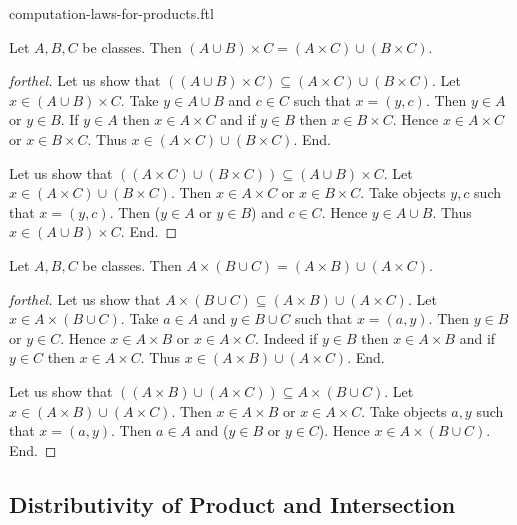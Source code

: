 \documentclass{naproche-library}
\begin{document}
\begin{smodule}{computation-laws-for-products.ftl}
  \begin{proposition}[forthel,id=FOUNDATIONS_05_8849658323402752]
    Let $A, B, C$ be classes.
    Then $(A \cup B) \times C = (A \times C) \cup (B \times C)$.
  \end{proposition}
  \begin{proof}[forthel]
    Let us show that $((A \cup B) \times C) \subseteq (A \times C) \cup (B \times C).$ %
      Let $x \in (A \cup B) \times C$.
      Take $y \in A \cup B$ and $c \in C$ such that $x = (y, c)$.
      Then $y \in A$ or $y \in B$.
      If $y \in A$ then $x \in A \times C$ and if $y \in B$ then $x \in B \times C$.
      Hence $x \in A \times C$ or $x \in B \times C$.
      Thus $x \in (A \times C) \cup (B \times C)$.
    End.

    Let us show that $((A \times C) \cup (B \times C)) \subseteq (A \cup B) \times C$. %
      Let $x \in (A \times C) \cup (B \times C)$.
      Then $x \in A \times C$ or $x \in B \times C$.
      Take objects $y, c$ such that $x = (y, c)$.
      Then ($y \in A$ or $y \in B$) and $c \in C$.
      Hence $y \in A \cup B$.
      Thus $x \in (A \cup B) \times C$.
    End.
  \end{proof}

  \begin{proposition}[forthel,id=FOUNDATIONS_05_476526841692160]
    Let $A, B, C$ be classes.
    Then $A \times (B \cup C) = (A \times B) \cup (A \times C)$.
  \end{proposition}
  \begin{proof}[forthel]
    Let us show that $A \times (B \cup C) \subseteq (A \times B) \cup (A \times C)$.
      Let $x \in A \times (B \cup C)$.
      Take $a \in A$ and $y \in B \cup C$ such that $x = (a, y)$.
      Then $y \in B$ or $y \in C$.
      Hence $x \in A \times B$ or $x \in A \times C$.
      Indeed if $y \in B$ then $x \in A \times B$ and if $y \in C$ then $x \in A \times C$.
      Thus $x \in (A \times B) \cup (A \times C)$.
    End.

    Let us show that $((A \times B) \cup (A \times C)) \subseteq A \times (B \cup C)$.
      Let $x \in (A \times B) \cup (A \times C)$.
      Then $x \in A \times B$ or $x \in A \times C$.
      Take objects $a, y$ such that $x = (a, y)$.
      Then $a \in A$ and ($y \in B$ or $y \in C$).
      Hence $x \in A \times (B \cup C)$.
    End.
  \end{proof}


  \subsection*{Distributivity of Product and Intersection}


\end{smodule}
\end{document}
